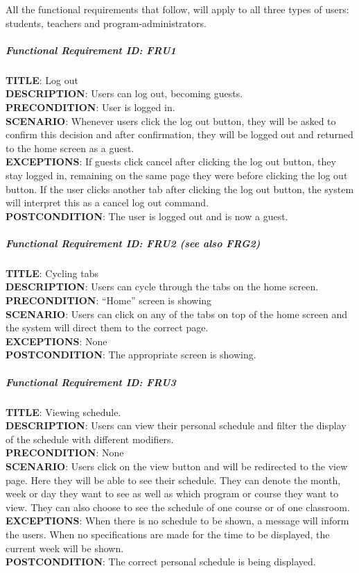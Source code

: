 \documentclass[12pt]{article}
\begin{document}
All the functional requirements that follow, will apply to all three
types of users: students, teachers and program-administrators.

\subparagraph{Functional Requirement \textbf{ID}:
FRU1}\label{functional-requirement-id-fru1}

\textbf{TITLE}: Log out\\\textbf{DESCRIPTION}: Users can log out,
becoming guests.\\\textbf{PRECONDITION}: User is logged
in.\\\textbf{SCENARIO}: Whenever users click the log out button, they
will be asked to confirm this decision and after confirmation, they will
be logged out and returned to the home screen as a
guest.\\\textbf{EXCEPTIONS}: If guests click cancel after clicking the
log out button, they stay logged in, remaining on the same page they
were before clicking the log out button. If the user clicks another tab
after clicking the log out button, the system will interpret this as a
cancel log out command.\\\textbf{POSTCONDITION}: The user is logged out
and is now a guest.

\subparagraph{Functional Requirement \textbf{ID}: FRU2 (see also
FRG2)}\label{functional-requirement-id-fru2-see-also-frg2}

\textbf{TITLE}: Cycling tabs\\\textbf{DESCRIPTION}: Users can cycle
through the tabs on the home screen.\\\textbf{PRECONDITION}: ``Home''
screen is showing\\\textbf{SCENARIO}: Users can click on any of the tabs
on top of the home screen and the system will direct them to the correct
page.\\\textbf{EXCEPTIONS}: None\\\textbf{POSTCONDITION}: The
appropriate screen is showing.

\subparagraph{Functional Requirement \textbf{ID}:
FRU3}\label{functional-requirement-id-fru3}

\textbf{TITLE}: Viewing schedule.\\\textbf{DESCRIPTION}: Users can view
their personal schedule and filter the display of the schedule with
different modifiers.\\\textbf{PRECONDITION}: None\\\textbf{SCENARIO}:
Users click on the view button and will be redirected to the view page.
Here they will be able to see their schedule. They can denote the month,
week or day they want to see as well as which program or course they
want to view. They can also choose to see the schedule of one course or
of one classroom.\\\textbf{EXCEPTIONS}: When there is no schedule to be
shown, a message will inform the users. When no specifications are made
for the time to be displayed, the current week will be
shown.\\\textbf{POSTCONDITION}: The correct personal schedule is being
displayed.
\end{document}
